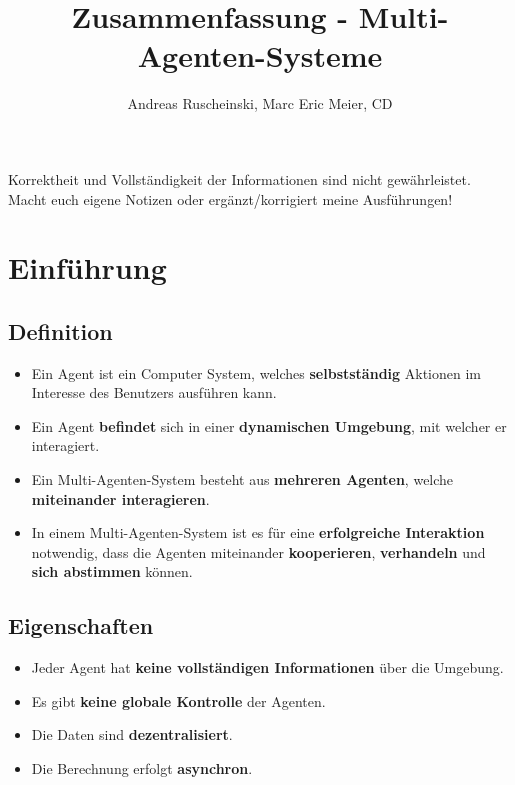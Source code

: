 \documentclass{article} %
\title{Zusammenfassung - Multi-Agenten-Systeme}
\author{
	Andreas Ruscheinski,
	Marc Eric Meier, 
	CD
}
\begin{document}
\maketitle
\begin{framed}Korrektheit und Vollständigkeit der Informationen sind nicht gewährleistet.
Macht euch eigene Notizen oder ergänzt/korrigiert meine Ausführungen!
\end{framed}
\setcounter{tocdepth}{1}
\tableofcontents

\section{Einführung}
	\subsection{Definition}
	\begin{itemize}
		\item Ein Agent ist ein Computer System, welches \textbf{selbstständig} Aktionen im Interesse des Benutzers ausführen kann.
		\item Ein Agent \textbf{befindet} sich in einer \textbf{dynamischen Umgebung}, mit welcher er interagiert.
		\item Ein Multi-Agenten-System besteht aus \textbf{mehreren Agenten}, welche \textbf{miteinander interagieren}.
		\item In einem Multi-Agenten-System ist es für eine  \textbf{erfolgreiche Interaktion} notwendig, dass die Agenten miteinander \textbf{kooperieren}, \textbf{verhandeln} und \textbf{sich abstimmen} können.
	\end{itemize}
	\subsection{Eigenschaften}
	\begin{itemize}
		\item Jeder Agent hat \textbf{keine vollständigen Informationen} über die Umgebung.
		\item Es gibt \textbf{keine globale Kontrolle} der Agenten.
		\item Die Daten sind \textbf{dezentralisiert}.
		\item Die Berechnung erfolgt \textbf{asynchron}.
	\end{itemize}
\end{document}
